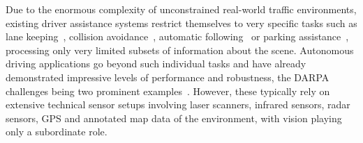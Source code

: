\documentclass{bmvc2k}
\begin{document}
 \hspace{0.1cm}
Due to the enormous complexity of unconstrained real-world traffic environments, existing driver assistance systems restrict themselves to very specific tasks such as lane keeping~\cite{lane_keeping}, collision avoidance~\cite{collision_avoidance}, automatic following~\cite{automatic_following} or parking assistance~\cite{parking_assistance}, processing only very limited subsets of information about the scene. Autonomous driving applications go beyond such individual tasks and have already demonstrated impressive levels of performance and robustness, the DARPA challenges being two prominent examples~\cite{darpa05, darpa07}. However, these typically rely on extensive technical sensor setups involving laser scanners, infrared sensors, radar sensors, GPS and annotated map data of the environment, with vision playing only a subordinate role. 
\end{document}
